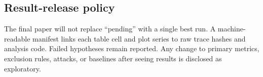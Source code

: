 \subsection{Result-release policy}

The final paper will not replace ``pending'' with a single best run. A machine-readable manifest links each table cell and plot series to raw trace hashes and analysis code. Failed hypotheses remain reported. Any change to primary metrics, exclusion rules, attacks, or baselines after seeing results is disclosed as exploratory.
